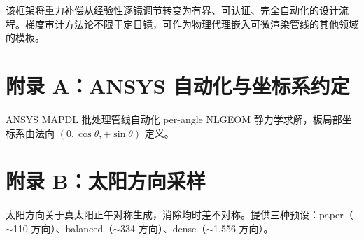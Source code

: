 \documentclass[12pt,a4paper]{ctexart}
\begin{document}
该框架将重力补偿从经验性逐镜调节转变为有界、可认证、完全自动化的设计流程。梯度审计方法论不限于定日镜，可作为物理代理嵌入可微渲染管线的其他领域的模板。

\appendix

\section*{附录 A：ANSYS 自动化与坐标系约定}

ANSYS MAPDL 批处理管线自动化 per-angle NLGEOM 静力学求解，板局部坐标系由法向 $(0, \cos\theta, +\sin\theta)$ 定义。

\section*{附录 B：太阳方向采样}

太阳方向关于真太阳正午对称生成，消除均时差不对称。提供三种预设：paper（$\sim$110 方向）、balanced（$\sim$334 方向）、dense（$\sim$1,556 方向）。
\end{document}
